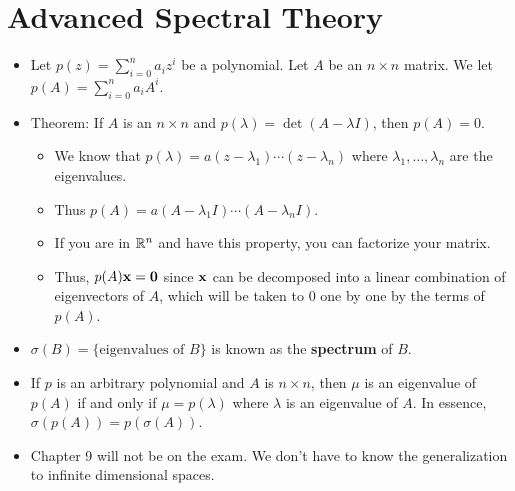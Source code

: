 \documentclass[../../notes.tex]{subfiles}
\begin{document}
\chapter{Advanced Spectral Theory}
\begin{itemize}
    \item {}Let $p(z)=\sum_{i=0}^na_iz^i$ be a polynomial. Let $A$ be an $n\times n$ matrix. We let $p(A)=\sum_{i=0}^na_iA^i$.
    \item Theorem: If $A$ is an $n\times n$ and $p(\lambda)=\det(A-\lambda I)$, then $p(A)=0$.
    \begin{itemize}
        \item We know that $p(\lambda)=a(z-\lambda_1)\cdots(z-\lambda_n)$ where $\lambda_1,\dots,\lambda_n$ are the eigenvalues.
        \item Thus $p(A)=a(A-\lambda_1I)\cdots(A-\lambda_nI)$.
        \item If you are in $\mathbb{R}^n$ and have this property, you can factorize your matrix.
        \item Thus, $p(A)\mathbf{x}=\bm{0}$ since $\mathbf{x}$ can be decomposed into a linear combination of eigenvectors of $A$, which will be taken to 0 one by one by the terms of $p(A)$.
    \end{itemize}
    \item $\sigma(B)=\{\text{eigenvalues of }B\}$ is known as the \textbf{spectrum} of $B$.
    \item If $p$ is an arbitrary polynomial and $A$ is $n\times n$, then $\mu$ is an eigenvalue of $p(A)$ if and only if $\mu=p(\lambda)$ where $\lambda$ is an eigenvalue of $A$. In essence, $\sigma(p(A))=p(\sigma(A))$.
    \item Chapter 9 will not be on the exam. We don't have to know the generalization to infinite dimensional spaces.
\end{itemize}
\end{document}
